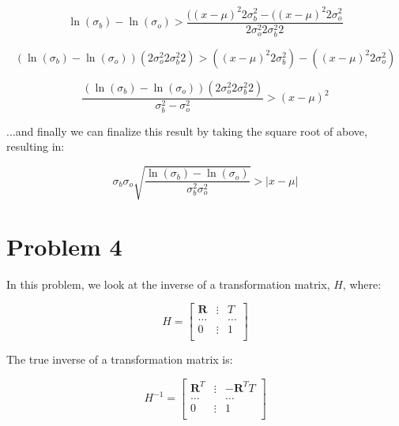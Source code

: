 \documentclass{article}
\begin{document}
\begin{equation}
    \ln(\sigma_b) - \ln(\sigma_o) > \frac{((x-\mu)^2 2\sigma_b^2 - ((x-\mu)^2 2\sigma_o^2 }{2\sigma^2_o2 \sigma^2_b2}
\end{equation}

\begin{equation}
    (\ln(\sigma_b) - \ln(\sigma_o)) (2\sigma^2_o2 \sigma^2_b2)  > ((x-\mu)^2 2\sigma_b^2) - ((x-\mu)^2 2\sigma_o^2)
\end{equation}

\begin{equation}
    \frac{(\ln(\sigma_b) - \ln(\sigma_o)) (2\sigma^2_o2 \sigma^2_b2)}{\sigma_b^2 - \sigma_o^2} > (x - \mu)^2
\end{equation}

...and finally we can finalize this result by taking the square root of above, resulting in:

\begin{equation}
    \sigma_b \sigma_o \sqrt{\frac{\ln(\sigma_b) - \ln(\sigma_o)}{\sigma_b^2 \sigma_o^2}} > \vert x - \mu \vert
\end{equation}

\section*{Problem 4}

In this problem, we look at the inverse of a transformation matrix, $H$, where:

\begin{equation}
    H = \begin{bmatrix}
        \boldsymbol{R} & \vdots & T \\
        \dots & & \dots \\
        0 & \vdots & 1 \\
    \end{bmatrix}
\end{equation}

The true inverse of a transformation matrix is:

\begin{equation}
    H^{-1} = \begin{bmatrix}
        \boldsymbol{R}^T & \vdots & -\boldsymbol{R}^T T \\
        \dots & & \dots \\
        0 & \vdots & 1 \\
    \end{bmatrix}
\end{equation}
\end{document}
